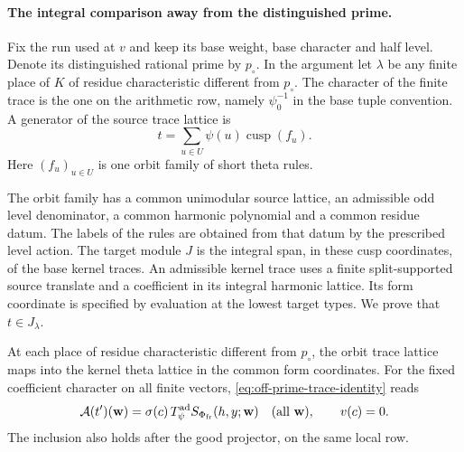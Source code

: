 \paragraph{The integral comparison away from the distinguished prime.}
\label{par:off-prime-row-trace}
\hypertarget{source-paired-off-prime-trace}{}
Fix the run used at \(v\) and keep its base weight, base
character and half level. Denote its distinguished rational
prime by \(p_\circ\). In the argument let \(\lambda\) be any
finite place of \(K\) of residue characteristic different
from \(p_\circ\). The character of the finite trace is the
one on the arithmetic row, namely \(\psi_0^{-1}\) in the
base tuple convention. A generator of the source trace
lattice is
\[
 t=\sum_{u\in U}\psi(u)\operatorname{cusp}(f_u).
\]
Here \((f_u)_{u\in U}\) is one orbit family of short theta
rules.

The orbit family has a common unimodular source lattice, an
admissible odd level denominator, a common harmonic
polynomial and a common residue datum. The labels of the
rules are obtained from that datum by the prescribed level action. The target module \(J\) is the integral span, in
these cusp coordinates, of the base kernel traces. An
admissible kernel trace uses a finite split-supported
source translate and a coefficient in its integral
harmonic lattice. Its form coordinate is specified by
evaluation at the lowest target types. We prove that
\(t\in J_\lambda\).
\label{cor:paired-off-prime-trace-1}

\begin{proposition}
\label{prop:off-prime-trace-inclusion}
At each place of residue characteristic different from
\(p_\circ\), the orbit trace lattice maps into the kernel theta
lattice in the common form coordinates. For the fixed coefficient character on all finite vectors, \eqref{eq:off-prime-trace-identity} reads
\[
 \mathcal A(t')(\mathbf w)=\sigma(c)\,T_\psi^{\rm ad}S_{\Phi_{\rm fr}}(h,y;\mathbf w)\quad(\text{all }\mathbf w),\qquad v(c)=0.
\]
 The inclusion also holds after the good
projector, on the same local row.
\end{proposition}

